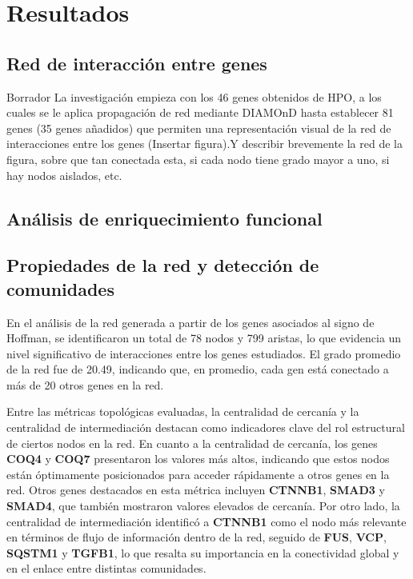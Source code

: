 \section{Resultados}

\subsection{Red de interacción entre genes}

Borrador
La investigación empieza con los 46 genes obtenidos de HPO, a los cuales se le aplica propagación de red mediante DIAMOnD hasta establecer 81 genes (35 genes añadidos) que permiten una representación visual de la red de interacciones entre los genes (Insertar figura).Y describir brevemente la red de la figura, sobre que tan conectada esta, si cada nodo tiene grado mayor a uno, si hay nodos aislados, etc.

\subsection{Análisis de enriquecimiento funcional}

\subsection{Propiedades de la red y detección de comunidades}

En el análisis de la red generada a partir de los genes asociados al signo de Hoffman, se identificaron un total de 78 nodos y 799 aristas, lo que evidencia un nivel significativo de interacciones entre los genes estudiados. El grado promedio de la red fue de 20.49, indicando que, en promedio, cada gen está conectado a más de 20 otros genes en la red.

Entre las métricas topológicas evaluadas, la centralidad de cercanía y la centralidad de intermediación destacan como indicadores clave del rol estructural de ciertos nodos en la red. En cuanto a la centralidad de cercanía, los genes \textbf{COQ4} y \textbf{COQ7} presentaron los valores más altos, indicando que estos nodos están óptimamente posicionados para acceder rápidamente a otros genes en la red. Otros genes destacados en esta métrica incluyen \textbf{CTNNB1}, \textbf{SMAD3} y \textbf{SMAD4}, que también mostraron valores elevados de cercanía. Por otro lado, la centralidad de intermediación identificó a \textbf{CTNNB1} como el nodo más relevante en términos de flujo de información dentro de la red, seguido de \textbf{FUS}, \textbf{VCP}, \textbf{SQSTM1} y \textbf{TGFB1}, lo que resalta su importancia en la conectividad global y en el enlace entre distintas comunidades.


